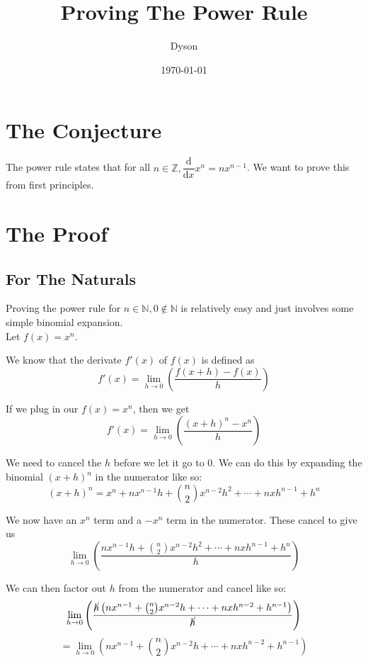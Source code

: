 \documentclass[a4paper]{article}
\title{Proving The Power Rule}
\author{Dyson}
\date{\today}
\newcommand{\deriv}{\dfrac{\text{d}}{\text{d}x}}
\begin{document}
\maketitle

\setlength{\parindent}{0em}
\setlength{\parskip}{1em}

\section{The Conjecture}

The power rule states that for all $\displaystyle n \in \mathbb{Z}, \deriv x^n = nx^{n - 1}$. We want to prove this from first principles.

\section{The Proof}

\subsection{For The Naturals}

Proving the power rule for $n \in \mathbb{N}, 0 \notin \mathbb{N}$ is relatively easy and just involves some simple binomial expansion.\\

Let $f(x) = x^n$.

We know that the derivate $f'(x)$ of $f(x)$ is defined as $$f'(x) = \lim_{h \to 0} \left( \frac{f(x + h) - f(x)}{h} \right)$$

If we plug in our $f(x) = x^n$, then we get $$f'(x) = \lim_{h \to 0} \left( \frac{(x + h)^n - x^n}{h} \right)$$

We need to cancel the $h$ before we let it go to 0. We can do this by expanding the binomial $(x + h)^n$ in the numerator like so: $$(x + h)^n = x^n + nx^{n - 1}h + \binom{n}{2}x^{n - 2}h^2 + \cdots + nxh^{n - 1} + h^n$$

We now have an $x^n$ term and a $-x^n$ term in the numerator. These cancel to give us $$\lim_{h \to 0} \left( \frac{nx^{n - 1}h + \binom{n}{2}x^{n - 2}h^2 + \cdots + nxh^{n - 1} + h^n}{h} \right)$$

We can then factor out $h$ from the numerator and cancel like so: $$\lim_{h \to 0} \left( \frac{\cancel{h} \left( nx^{n - 1} + \binom{n}{2}x^{n - 2}h + \cdots + nxh^{n - 2} + h^{n - 1} \right)}{\cancel{h}} \right)$$
$$=\lim_{h \to 0} \left(nx^{n - 1} + \binom{n}{2}x^{n - 2}h + \cdots + nxh^{n - 2} + h^{n - 1} \right)$$
\end{document}

